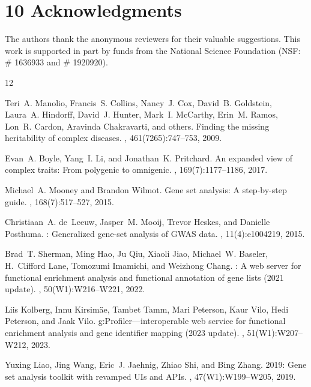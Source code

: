 \documentclass[unnumsec,webpdf,contemporary,large]{oup-authoring-template}%
\theoremstyle{thmstyleone}%
\theoremstyle{thmstyletwo}%
\theoremstyle{thmstylethree}%
\begin{document}
\section{10 Acknowledgments}
The authors thank the anonymous reviewers for their valuable suggestions. This work is supported in part by funds from the National Science Foundation (NSF: \# 1636933 and \# 1920920).


\begin{thebibliography}{12}

Teri~A. Manolio, Francis~S. Collins, Nancy~J. Cox, David~B. Goldstein,
Laura~A. Hindorff, David~J. Hunter, Mark~I. McCarthy, Erin~M. Ramos,
Lon~R. Cardon, Aravinda Chakravarti, and others.
\newblock Finding the missing heritability of complex diseases.
, 461(7265):747--753, 2009.

Evan~A. Boyle, Yang~I. Li, and Jonathan~K. Pritchard.
\newblock An expanded view of complex traits: From polygenic to omnigenic.
, 169(7):1177--1186, 2017.

Michael~A. Mooney and Brandon Wilmot.
\newblock Gene set analysis: A step-by-step guide.
, 168(7):517--527, 2015.

Christiaan~A. de~Leeuw, Jasper~M. Mooij, Trevor Heskes, and Danielle Posthuma.
: Generalized gene-set analysis of {GWAS} data.
, 11(4):e1004219, 2015.

Brad~T. Sherman, Ming Hao, Ju Qiu, Xiaoli Jiao, Michael~W. Baseler,
H.~Clifford Lane, Tomozumi Imamichi, and Weizhong Chang.
: A web server for functional enrichment analysis and
functional annotation of gene lists (2021 update).
, 50(W1):W216--W221, 2022.

Liis Kolberg, Innu Kirsim{\"a}e, Tambet Tamm, Mari Peterson, Kaur Vilo,
Hedi Peterson, and Jaak Vilo.
\newblock g:{P}rofiler---interoperable web service for functional enrichment
analysis and gene identifier mapping (2023 update).
, 51(W1):W207--W212, 2023.

Yuxing Liao, Jing Wang, Eric~J. Jaehnig, Zhiao Shi, and Bing Zhang.
 2019: Gene set analysis toolkit with revamped {UIs} and
{APIs}.
, 47(W1):W199--W205, 2019.


\end{thebibliography}
\end{document}
